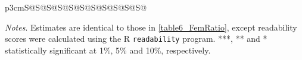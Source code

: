 \begin{table}
\begin{threeparttable}
\begin{tabular}{p{3cm}S@{}S@{}S@{}S@{}S@{}S@{}S@{}S@{}S@{}S@{}S@{}}
            \bottomrule
        \end{tabular}
        \begin{tablenotes}
            \tiny
            \item \textit{Notes}. Estimates are identical to those in \autoref{table6_FemRatio}, except readability scores were calculated using the R \texttt{readability} program. ***, ** and * statistically significant at 1\%, 5\% and 10\%, respectively.
        \end{tablenotes}
    \end{threeparttable}

\end{table}

